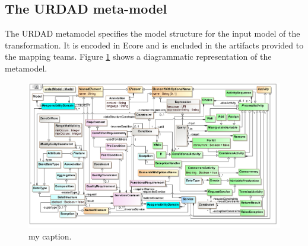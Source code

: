 \subsection{The URDAD meta-model}

The URDAD metamodel specifies the model structure for the input model of the transformation. It is encoded in Ecore and is encluded in the artifacts provided to the mapping teams. Figure \ref{fig:metamodel} shows a diagrammatic representation of the metamodel. 

\begin{figure}
  \centering
  \includegraphics{metamodel}
  \caption{my caption.}
  \label{fig:metamodel}
\end{figure}


